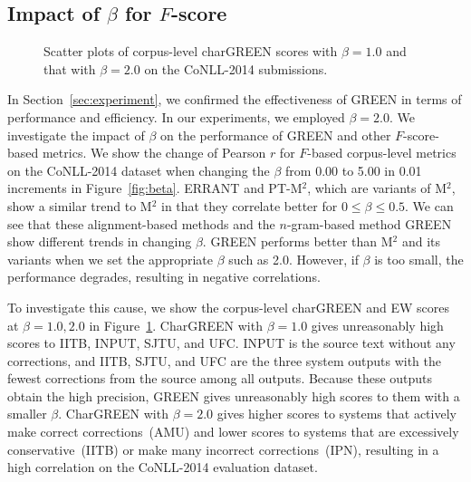 \documentclass[11pt]{article}
\begin{document}
\subsection{Impact of $\beta$ for $F$-score}
\label{sec:optimal_beta}

\begin{figure}[!t]
    \centering
    
    \scattercorpuschargreena %
    \scattercorpuschargreenb %
    \caption{Scatter plots of corpus-level charGREEN scores with $\beta = 1.0$ and that with $\beta = 2.0$ on the CoNLL-2014 submissions.}
    \label{fig:corpus_green_scatters}
\end{figure}

In Section~\ref{sec:experiment}, we confirmed the effectiveness of GREEN in terms of performance and efficiency.
In our experiments, we employed $\beta = 2.0$.
We investigate the impact of $\beta$ on the performance of GREEN and other $F$-score-based metrics.
We show the change of Pearson $r$ for $F$-based corpus-level metrics on the CoNLL-2014 dataset when changing the $\beta$ from 0.00 to 5.00 in 0.01 increments in Figure~\ref{fig:beta}.
ERRANT and PT-M${}^2$, which are variants of M${}^2$, show a similar trend to M${}^2$ in that they correlate better for $ 0 \leq \beta \leq 0.5$.
We can see that these alignment-based methods and the $n$-gram-based method GREEN show different trends in changing $\beta$.
GREEN performs better than M${}^2$ and its variants when we set the appropriate $\beta$ such as 2.0.
However, if $\beta$ is too small, the performance degrades, resulting in negative correlations.

To investigate this cause, we show the corpus-level charGREEN and EW scores at $\beta=1.0, 2.0$ in Figure~\ref{fig:corpus_green_scatters}.
CharGREEN with $\beta = 1.0$ gives unreasonably high scores to \textsf{IITB}, \textsf{INPUT}, \textsf{SJTU}, and \textsf{UFC}.
\textsf{INPUT} is the source text without any corrections, and \textsf{IITB}, \textsf{SJTU}, and \textsf{UFC} are the three system outputs with the fewest corrections from the source among all outputs.
Because these outputs obtain the high precision, GREEN gives unreasonably high scores to them with a smaller $\beta$.
CharGREEN with $\beta = 2.0$ gives higher scores to systems that actively make correct corrections~(\textsf{AMU}) and lower scores to systems that are excessively conservative~(\textsf{IITB}) or make many incorrect corrections~(\textsf{IPN}), resulting in a high correlation on the CoNLL-2014 evaluation dataset.
\end{document}

